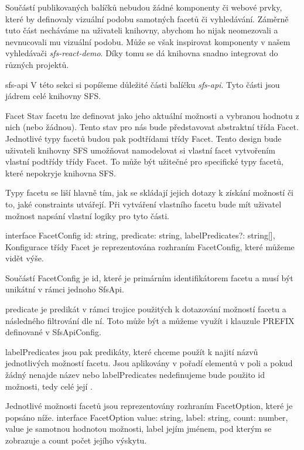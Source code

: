 Součástí publikovaných balíčků nebudou žádné komponenty či webové prvky, které by definovaly vizuální podobu samotných facetů či vyhledávání. 
Záměrně tuto část necháváme na uživateli knihovny, abychom ho nijak neomezovali a nevnucovali mu vizuální podobu.
Může se však inspirovat komponenty v našem vyhledávači {\em sfs-react-demo}.
Díky tomu se dá knihovna snadno integrovat do různých projektů.

\sec sfs-api
V této sekci si popíšeme důležité části balíčku {\em sfs-api}.
Tyto části jsou jádrem celé knihovny SFS.

\secc [facet] Facet
Stav facetu lze definovat jako jeho aktuální možnosti a vybranou hodnotu z nich (nebo žádnou).
Tento stav pro nás bude představovat abstraktní třída {\ssr Facet}.
Jednotlivé typy facetů budou pak podtřídami třídy {\ssr Facet}.
Tento design bude uživateli knihovny SFS umožňovat namodelovat si vlastní facet vytvořením vlastní podtřídy třídy {\ssr Facet}.
To může být užitečné pro specifické typy facetů, které nepokryje knihovna SFS.

Typy facetu se liší hlavně tím, jak se skládají jejich dotazy k získání možností či to, jaké constraints utvářejí.
Při vytváření vlastního facetu bude mít uživatel možnost napsání vlastní logiky pro tyto části.

\begtt
interface FacetConfig {
  id: string,
  predicate: string,
  labelPredicates?: string[],
}
\endtt
Konfigurace třídy {\ssr Facet} je reprezentována rozhraním {\ssr FacetConfig}, které můžeme vidět výše.

Součástí {\ssr FacetConfig} je {\ssr id}, které je primárním identifikátorem facetu a musí být unikátní v rámci jednoho {\ssr SfsApi}.

{\ssr predicate} je predikát v rámci  trojice použitých k dotazování možností facetu a následného filtrování dle ní.
Toto může být  a můžeme využít i klauzule {\ssr PREFIX} definované v {\ssr SfsApiConfig}.

{\ssr labelPredicates} jsou pak predikáty, které chceme použít k najití názvů jednotlivých možností facetu.
Jsou aplikovány v pořadí elementů v poli a pokud žádný nenajde název nebo {\ssr labelPredicates} nedefinujeme bude použito {\ssr id} možnosti, tedy celé její .

Jednotlivé možnosti facetů jsou reprezentovány rozhraním {\ssr FacetOption}, které je popsáno níže.
\begtt
interface FacetOption {
  value: string,
  label: string,
  count: number,
}
\endtt
{\ssr value} je samotnou hodnotou možnosti, {\ssr label} jejím jménem, pod kterým se zobrazuje a {\ssr count} počet jejího výskytu.


